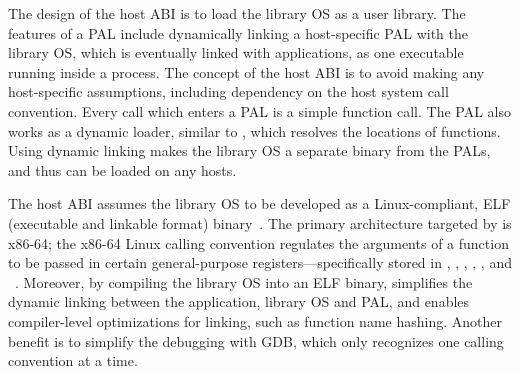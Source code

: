 The design of the host ABI is to load the library OS as a user library.
The features of a PAL include dynamically linking a host-specific PAL with the library OS,
which is eventually linked with applications,
as one executable running inside a process.
The concept of the host ABI is to avoid making any host-specific assumptions,
including dependency on the host system call convention.
Every call which enters a PAL is a simple function call.
The PAL also works as a dynamic loader, similar to ,
which resolves the locations of functions.
Using dynamic linking makes the library OS a separate binary from the PALs,
and thus can be loaded on any hosts.
 





The host ABI assumes the library OS to be developed as a Linux-compliant, ELF (executable and linkable format) binary~\cite{elf-format}.
The primary architecture targeted by \graphene{} is x86-64;
the x86-64 Linux calling convention
regulates the arguments of a function to be passed in certain general-purpose registers---specifically stored in , , , , , and ~\cite{system-v-abi}.
Moreover, by compiling the library OS into an ELF binary,
\graphene{} simplifies the dynamic linking between the application, library OS and PAL,
and enables compiler-level optimizations for linking,
such as function name hashing.
Another benefit is to simplify the debugging with GDB, which only recognizes one calling convention at a time.



